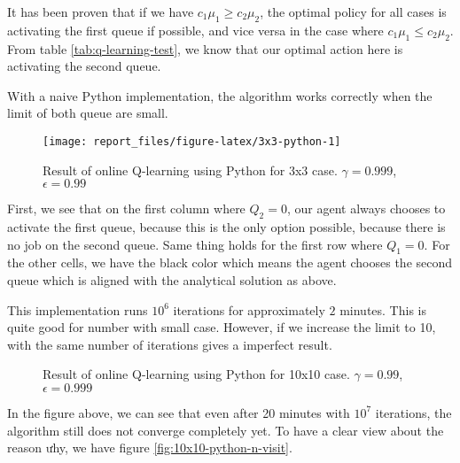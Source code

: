 \documentclass[
  a4paper, xcolor = usenames,dvipsnames]{article}
\begin{document}
It has been proven that if we have \(c_{1} \mu_{1} \ge c_{2} \mu_{2}\), the optimal policy for all cases is activating the first queue if possible, and vice versa in the case where \(c_{1} \mu_{1} \le c_{2} \mu_{2}\). From table \ref{tab:q-learning-test}, we know that our optimal action here is activating the second queue.

With a naive Python implementation, the algorithm works correctly when the limit of both queue are small.

\begin{figure}

{\centering \texttt{[image: report\_files/figure-latex/3x3-python-1]} 

}

\caption{Result of online Q-learning using Python for 3x3 case. $\gamma = 0.999$, $\epsilon = 0.99$}\label{fig:3x3-python}
\end{figure}

First, we see that on the first column where \(Q_{2} = 0\), our agent always chooses to activate the first queue, because this is the only option possible, because there is no job on the second queue. Same thing holds for the first row where \(Q_{1} = 0\). For the other cells, we have the black color which means the agent chooses the second queue which is aligned with the analytical solution as above.

This implementation runs \(10^6\) iterations for approximately \(2\) minutes. This is quite good for number with small case. However, if we increase the limit to 10, with the same number of iterations gives a imperfect result.

\begin{figure}

{\centering {}

}

\caption{Result of online Q-learning using Python for 10x10 case. $\gamma = 0.99$, $\epsilon = 0.999$}\label{fig:10x10-python}
\end{figure}

In the figure above, we can see that even after 20 minutes with \(10^7\) iterations, the algorithm still does not converge completely yet. To have a clear view about the reason ưhy, we have figure \ref{fig:10x10-python-n-visit}.
\end{document}
